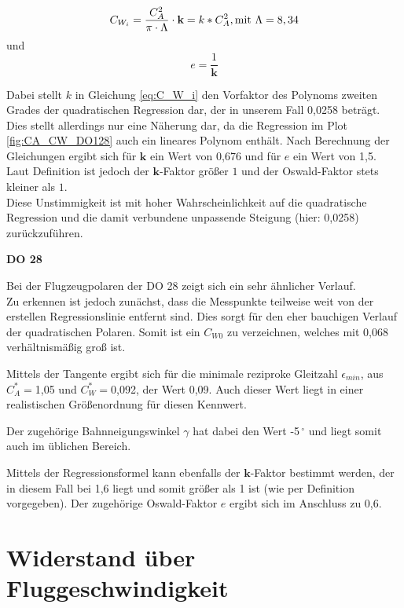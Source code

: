 \begin{equation}
C_{W_{i}}=\frac{C_A^2}{\pi \cdot \Lambda}\cdot \textbf{k}=k*C_A^2, \\ \mathrm{mit} \ \Lambda=8,34 
\label{eq:C_W_i}
\end{equation}
und
\begin{equation}
e=\frac{1}{\textbf{k}}
\end{equation}

Dabei stellt $k$ in Gleichung \ref{eq:C_W_i} den Vorfaktor des Polynoms zweiten Grades der quadratischen Regression dar, der in unserem Fall 0,0258 beträgt. Dies stellt allerdings nur eine Näherung dar, da die Regression im Plot \ref{fig:CA_CW_DO128} auch ein lineares Polynom enthält. Nach Berechnung der Gleichungen ergibt sich für $\textbf{k}$ ein Wert von 0,676 und für $e$ ein Wert von 1,5. 
Laut Definition ist jedoch der $\textbf{k}$-Faktor größer $1$ und der Oswald-Faktor stets kleiner als $1$. \\
Diese Unstimmigkeit ist mit hoher Wahrscheinlichkeit auf die quadratische Regression und die damit verbundene unpassende Steigung (hier: 0,0258) zurückzuführen.

\textbf{DO 28}

Bei der Flugzeugpolaren der DO 28 zeigt sich ein sehr ähnlicher Verlauf. \\ Zu erkennen ist jedoch zunächst, dass die Messpunkte teilweise weit von der erstellen Regressionslinie entfernt sind. Dies sorgt für den eher bauchigen Verlauf der quadratischen Polaren. Somit ist ein $C_{W0}$ zu verzeichnen, welches mit 0,068 verhältnismäßig groß ist. 

Mittels der Tangente ergibt sich für die minimale reziproke Gleitzahl $\epsilon_{min}$, aus $C_A^*=$1,05 und $C_W^*=$0,092, der Wert 0,09. Auch dieser Wert liegt in einer realistischen Größenordnung für diesen Kennwert.

Der zugehörige Bahnneigungswinkel $\gamma$ hat dabei den Wert -5$^{\ \circ}$ und liegt somit auch im üblichen Bereich. 

Mittels der Regressionsformel kann ebenfalls der $\textbf{k}$-Faktor bestimmt werden, der in diesem Fall bei 1,6 liegt und somit größer als 1 ist (wie per Definition vorgegeben). Der zugehörige Oswald-Faktor $e$ ergibt sich im Anschluss zu 0,6. 

\section{Widerstand über Fluggeschwindigkeit}

